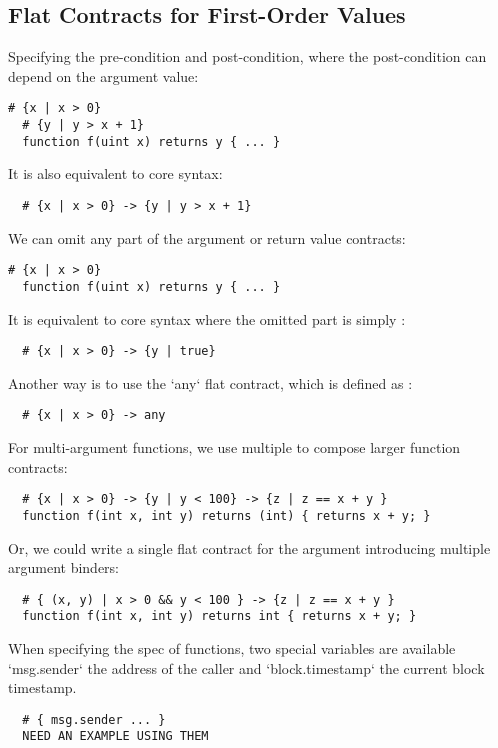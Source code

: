 \documentclass[acmsmall,review,anonymous]{acmart}\settopmatter{printfolios=true,printccs=false,printacmref=false}
\begin{document}
\subsection{Flat Contracts for First-Order Values}

Specifying the pre-condition and post-condition, where the post-condition
can depend on the argument value:

\begin{lstlisting}[language=Solidity]
  # {x | x > 0}
  # {y | y > x + 1}
  function f(uint x) returns y { ... }
\end{lstlisting}
It is also equivalent to core syntax:
\begin{lstlisting}
  # {x | x > 0} -> {y | y > x + 1}
\end{lstlisting}

We can omit any part of the argument or return value contracts:

\begin{lstlisting}[language=Solidity]
  # {x | x > 0}
  function f(uint x) returns y { ... }
\end{lstlisting}
It is equivalent to core syntax where the omitted part is simply :

\begin{lstlisting}
  # {x | x > 0} -> {y | true}
\end{lstlisting}
Another way is to use the `any` flat contract, which is defined as
:
\begin{lstlisting}
  # {x | x > 0} -> any
\end{lstlisting}

For multi-argument functions, we use multiple \code{->} to compose larger function
contracts:
\begin{lstlisting}
  # {x | x > 0} -> {y | y < 100} -> {z | z == x + y }
  function f(int x, int y) returns (int) { returns x + y; }
\end{lstlisting}
Or, we could write a single flat contract for the argument introducing
multiple argument binders:
\begin{lstlisting}
  # { (x, y) | x > 0 && y < 100 } -> {z | z == x + y }
  function f(int x, int y) returns int { returns x + y; }
\end{lstlisting}

When specifying the spec of functions, two special variables are available
`msg.sender` the address of the caller and `block.timestamp` the current
block timestamp.

\begin{lstlisting}
  # { msg.sender ... }
  NEED AN EXAMPLE USING THEM
\end{lstlisting}
\end{document}
